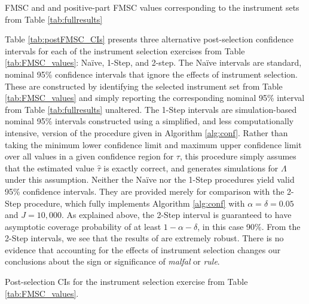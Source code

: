 \begin{table}[htbp]
	\centering
	
		\caption{FMSC and and positive-part FMSC values corresponding to the instrument sets from Table \ref{tab:fullresults}}
		\label{tab:FMSC_values}
\end{table}

Table \ref{tab:postFMSC_CIs} presents three alternative post-selection confidence intervals for each of the instrument selection exercises from Table \ref{tab:FMSC_values}: Na\"{i}ve, 1-Step, and 2-step.
The Na\"{i}ve intervals are standard, nominal 95\% confidence intervals that ignore the effects of instrument selection.
These are constructed by identifying the selected instrument set from Table \ref{tab:FMSC_values} and simply reporting the corresponding nominal 95\% interval from Table \ref{tab:fullresults} unaltered.
The 1-Step intervals are simulation-based nominal 95\% intervals constructed using a simplified, and less computationally intensive, version of the procedure given in Algorithm \ref{alg:conf}.
Rather than taking the minimum lower confidence limit and maximum upper confidence limit over all values in a given confidence region for $\tau$, this procedure simply assumes that the estimated value $\widehat{\tau}$ is exactly correct, and generates simulations for $\Lambda$ under this assumption.
Neither the Na\"{i}ve nor the 1-Step procedures yield valid 95\% confidence intervals.
They are provided merely for comparison with the 2-Step procedure, which fully implements Algorithm \ref{alg:conf} with $\alpha = \delta = 0.05$ and $J=10,000$. 
As explained above, the 2-Step interval is guaranteed to have asymptotic coverage probability of at least $1 - \alpha - \delta$, in this case 90\%.
From the 2-Step intervals, we see that the results of \cite{Carstensen2006} are extremely robust. 
There is no evidence that accounting for the effects of instrument selection changes our conclusions about the sign or significance of \emph{malfal} or \emph{rule}.

\begin{table}[htbp]
	\centering
	
	\caption{Post-selection CIs for the instrument selection exercise from Table \ref{tab:FMSC_values}.}
	\label{tab:postFMSC_CIs}
\end{table}

